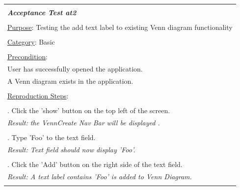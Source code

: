 \documentclass[fontsize=12pt,paper=letter,twoside]{scrartcl}
\begin{document}
\newpage

\begin{table}[!h]
	\begin{tabular}{|l|}
		\hline
		\\
		\textbf{\emph{Acceptance Test at2}} 	
		\\\\
		\underline{Purpose}: Testing the add text label to existing Venn diagram functionality \\
		\\
		\underline{Category}: Basic		\\
		\\
		\underline{Precondition}:															\\ \qquad
		User has successfully opened the application.
		\\ \qquad
		A Venn diagram exists in the application.
		\\\\
		\underline{Reproduction Steps}:				
		\\\\ \qquad 1. Click the 'show' button on the top left of the screen.
		\\ \qquad \textit{Result: the VennCreate Nav Bar will be displayed .} 
		\\\\ \qquad 2. Type 'Foo' to the text field.
		\\ \qquad \textit{Result: Text field should now display 'Foo'.} 
		\\\\ \qquad 3. Click the 'Add' button on the right side of the text field.
		\\ \qquad \textit{Result: A text label contains 'Foo' is added to Venn Diagram.} 
		\\\\
		\hline
	\end{tabular}
\end{table}

\newpage
\end{document}
